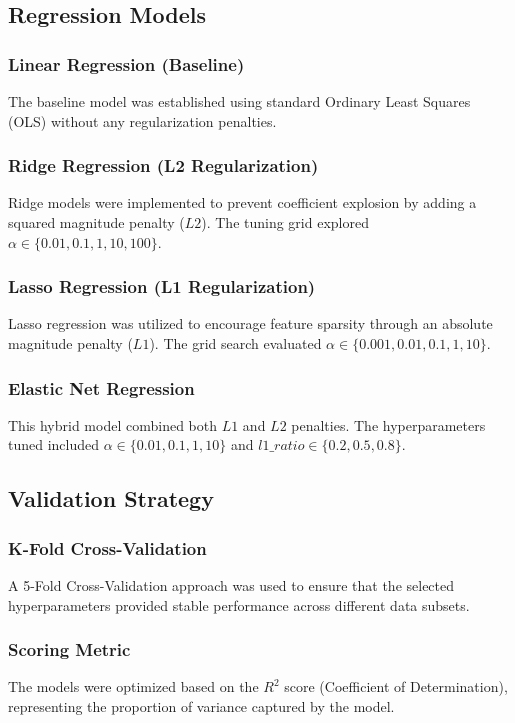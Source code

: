 \documentclass[11pt]{article}
\begin{document}
\subsection*{Regression Models}
\subsubsection*{Linear Regression (Baseline)}
The baseline model was established using standard Ordinary Least Squares (OLS) without any regularization penalties.

\subsubsection*{Ridge Regression (L2 Regularization)}
Ridge models were implemented to prevent coefficient explosion by adding a squared magnitude penalty ($L2$). The tuning grid explored $\alpha \in \{0.01, 0.1, 1, 10, 100\}$.

\subsubsection*{Lasso Regression (L1 Regularization)}
Lasso regression was utilized to encourage feature sparsity through an absolute magnitude penalty ($L1$). The grid search evaluated $\alpha \in \{0.001, 0.01, 0.1, 1, 10\}$.

\subsubsection*{Elastic Net Regression}
This hybrid model combined both $L1$ and $L2$ penalties. The hyperparameters tuned included $\alpha \in \{0.01, 0.1, 1, 10\}$ and $l1\_ratio \in \{0.2, 0.5, 0.8\}$.

\subsection*{Validation Strategy}
\subsubsection*{K-Fold Cross-Validation}
A 5-Fold Cross-Validation approach was used to ensure that the selected hyperparameters provided stable performance across different data subsets.

\subsubsection*{Scoring Metric}
The models were optimized based on the $R^2$ score (Coefficient of Determination), representing the proportion of variance captured by the model.
\end{document}
